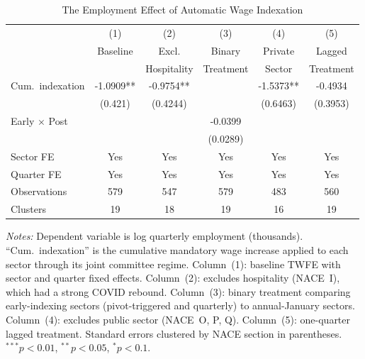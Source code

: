 \begin{table}[t]
\centering
\caption{The Employment Effect of Automatic Wage Indexation}
\label{tab:main}
\begin{tabular}{lccccc}
\hline\hline
 & (1) & (2) & (3) & (4) & (5) \\
 & Baseline & Excl. & Binary & Private & Lagged \\
 & & Hospitality & Treatment & Sector & Treatment \\
\hline
Cum.\ indexation & -1.0909** & -0.9754** & & -1.5373** & -0.4934 \\
 & (0.421) & (0.4244) & & (0.6463) & (0.3953) \\
Early $\times$ Post & & & -0.0399 & & \\
 & & & (0.0289) & & \\
\hline
Sector FE & Yes & Yes & Yes & Yes & Yes \\
Quarter FE & Yes & Yes & Yes & Yes & Yes \\
Observations & 579 & 547 & 579 & 483 & 560 \\
Clusters & 19 & 18 & 19 & 16 & 19 \\
\hline\hline
\end{tabular}
\begin{tablenotes}[flushleft]
\small
\item \textit{Notes:} Dependent variable is log quarterly employment (thousands). ``Cum.\ indexation'' is the cumulative mandatory wage increase applied to each sector through its joint committee regime. Column~(1): baseline TWFE with sector and quarter fixed effects. Column~(2): excludes hospitality (NACE~I), which had a strong COVID rebound. Column~(3): binary treatment comparing early-indexing sectors (pivot-triggered and quarterly) to annual-January sectors. Column~(4): excludes public sector (NACE~O, P, Q). Column~(5): one-quarter lagged treatment. Standard errors clustered by NACE section in parentheses. $^{***}p<0.01$, $^{**}p<0.05$, $^{*}p<0.1$.
\end{tablenotes}
\end{table}

